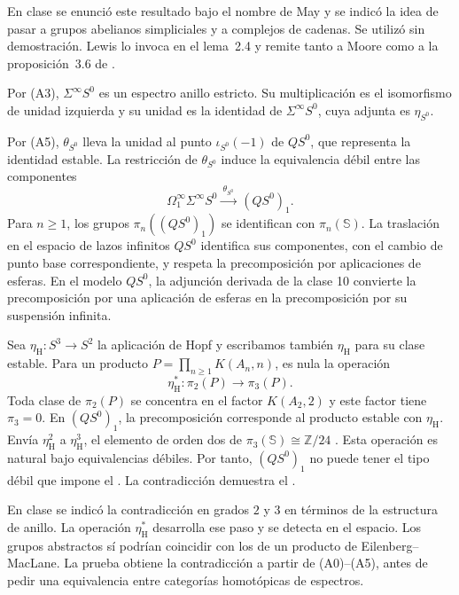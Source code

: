 \begin{nota}
En clase se enunció este resultado bajo el nombre de May y se indicó la idea de pasar a grupos abelianos simpliciales y a complejos de cadenas. Se utilizó sin demostración. Lewis lo invoca en el lema~2.4 y remite tanto a Moore como a la proposición~3.6 de \cite{may1972gils}.
\end{nota}

Por (A3), $\Sigma^\infty S^0$ es un espectro anillo estricto. Su multiplicación es el isomorfismo de unidad izquierda y su unidad es la identidad de $\Sigma^\infty S^0$, cuya adjunta es $\eta_{S^0}$.

Por (A5), $\theta_{S^0}$ lleva la unidad al punto $\iota_{S^0}(-1)$ de $QS^0$, que representa la identidad estable. La restricción de $\theta_{S^0}$ induce la equivalencia débil entre las componentes
\[
\Omega^\infty_1\Sigma^\infty S^0\xrightarrow{\ \theta_{S^0}\ }\,(QS^0)_1.
\]
Para $n\geq1$, los grupos $\pi_n((QS^0)_1)$ se identifican con $\pi_n(\mathbb S)$. La traslación en el espacio de lazos infinitos $QS^0$ identifica sus componentes, con el cambio de punto base correspondiente, y respeta la precomposición por aplicaciones de esferas. En el modelo $QS^0$, la adjunción derivada de la clase 10 convierte la precomposición por una aplicación de esferas en la precomposición por su suspensión infinita.

Sea $\eta_{\mathrm H}\colon S^3\to S^2$ la aplicación de Hopf y escribamos también $\eta_{\mathrm H}$ para su clase estable. Para un producto $P=\prod_{n\geq1}K(A_n,n)$, es nula la operación
\[
\eta_{\mathrm H}^*\colon \pi_2(P)\longrightarrow\pi_3(P).
\]
Toda clase de $\pi_2(P)$ se concentra en el factor $K(A_2,2)$ y este factor tiene $\pi_3=0$. En $(QS^0)_1$, la precomposición corresponde al producto estable con $\eta_{\mathrm H}$. Envía $\eta_{\mathrm H}^2$ a $\eta_{\mathrm H}^3$, el elemento de orden dos de $\pi_3(\mathbb S)\cong\mathbb Z/24$ \cite[§~4.2, p.~385]{hatcher2002}. Esta operación es natural bajo equivalencias débiles. Por tanto, $(QS^0)_1$ no puede tener el tipo débil que impone el . La contradicción demuestra el .

\begin{nota}
En clase se indicó la contradicción en grados $2$ y $3$ en términos de la estructura de anillo. La operación $\eta_{\mathrm H}^*$ desarrolla ese paso y se detecta en el espacio. Los grupos abstractos sí podrían coincidir con los de un producto de Eilenberg--MacLane. La prueba obtiene la contradicción a partir de (A0)--(A5), antes de pedir una equivalencia entre categorías homotópicas de espectros.
\end{nota}

